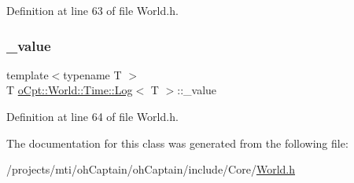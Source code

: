 Definition at line 63 of file World.\+h.

\hypertarget{classo_cpt_1_1_world_1_1_time_1_1_log_a63eb942576004d0b6ff7b1cbea7deb9c}{}\label{classo_cpt_1_1_world_1_1_time_1_1_log_a63eb942576004d0b6ff7b1cbea7deb9c} 
\subsubsection{\texorpdfstring{\+\_\+value}{\_value}}
{\footnotesize\ttfamily template$<$typename T $>$ \\
T \hyperlink{classo_cpt_1_1_world_1_1_time_1_1_log}{o\+Cpt\+::\+World\+::\+Time\+::\+Log}$<$ T $>$\+::\+\_\+value\hspace{0.3cm}{\ttfamily [private]}}



Definition at line 64 of file World.\+h.



The documentation for this class was generated from the following file\+:\begin{DoxyCompactItemize}
\item 
/projects/mti/oh\+Captain/oh\+Captain/include/\+Core/\hyperlink{_world_8h}{World.\+h}\end{DoxyCompactItemize}
